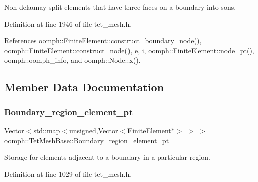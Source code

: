 Non-\/delaunay split elements that have three faces on a boundary into sons. 

Definition at line 1946 of file tet\+\_\+mesh.\+h.



References oomph\+::\+Finite\+Element\+::construct\+\_\+boundary\+\_\+node(), oomph\+::\+Finite\+Element\+::construct\+\_\+node(), e, i, oomph\+::\+Finite\+Element\+::node\+\_\+pt(), oomph\+::oomph\+\_\+info, and oomph\+::\+Node\+::x().



\subsection{Member Data Documentation}
\mbox{\label{classoomph_1_1TetMeshBase_a674ccfa46efe3de473a3daafe65dc537}} 
\subsubsection{\texorpdfstring{Boundary\+\_\+region\+\_\+element\+\_\+pt}{Boundary\_region\_element\_pt}}
{\footnotesize\ttfamily \hyperlink{classoomph_1_1Vector}{Vector}$<$std\+::map$<$unsigned,\hyperlink{classoomph_1_1Vector}{Vector}$<$\hyperlink{classoomph_1_1FiniteElement}{Finite\+Element}$\ast$$>$ $>$ $>$ oomph\+::\+Tet\+Mesh\+Base\+::\+Boundary\+\_\+region\+\_\+element\+\_\+pt\hspace{0.3cm}{\ttfamily [protected]}}



Storage for elements adjacent to a boundary in a particular region. 



Definition at line 1029 of file tet\+\_\+mesh.\+h.

\mbox{\label{classoomph_1_1TetMeshBase_a79260313236fa264d56b2736f7347e35}} 
